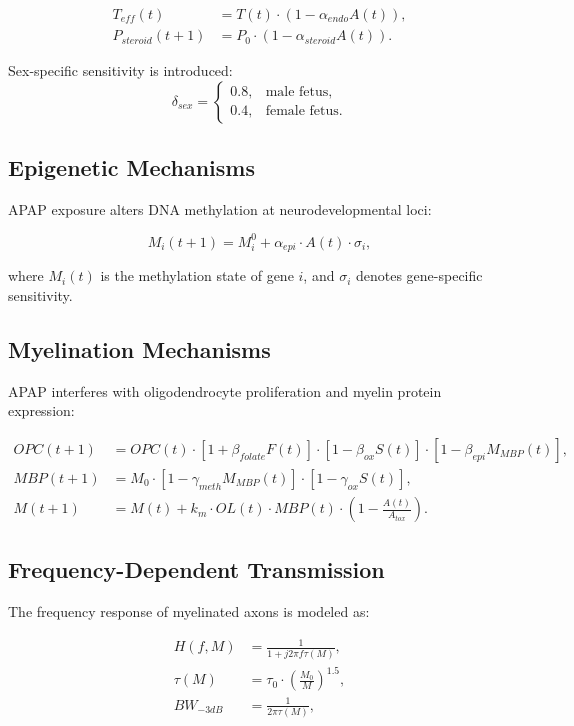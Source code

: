 \documentclass[12pt]{article}
\begin{document}
\begin{align}
T_{eff}(t) &= T(t) \cdot \left(1 - \alpha_{endo}A(t)\right), \\
P_{steroid}(t+1) &= P_0 \cdot \left(1 - \alpha_{steroid}A(t)\right).
\end{align}

Sex-specific sensitivity is introduced:
\[
\delta_{sex} = \begin{cases}
0.8, & \text{male fetus}, \\
0.4, & \text{female fetus}.
\end{cases}
\]

\subsection{Epigenetic Mechanisms}
APAP exposure alters DNA methylation at neurodevelopmental loci:

\begin{equation}
M_i(t+1) = M_i^0 + \alpha_{epi} \cdot A(t) \cdot \sigma_i,
\end{equation}

where $M_i(t)$ is the methylation state of gene $i$, and $\sigma_i$ denotes gene-specific sensitivity.

\subsection{Myelination Mechanisms}
APAP interferes with oligodendrocyte proliferation and myelin protein expression:

\begin{align}
OPC(t+1) &= OPC(t) \cdot [1 + \beta_{folate}F(t)] \cdot [1 - \beta_{ox}S(t)] \cdot [1 - \beta_{epi}M_{MBP}(t)], \\
MBP(t+1) &= M_0 \cdot [1 - \gamma_{meth}M_{MBP}(t)] \cdot [1 - \gamma_{ox}S(t)], \\
M(t+1) &= M(t) + k_m \cdot OL(t) \cdot MBP(t) \cdot \left(1 - \frac{A(t)}{A_{tox}}\right).
\end{align}

\subsection{Frequency-Dependent Transmission}
The frequency response of myelinated axons is modeled as:

\begin{align}
H(f,M) &= \frac{1}{1 + j2\pi f \tau(M)}, \\
\tau(M) &= \tau_0 \cdot \left(\frac{M_0}{M}\right)^{1.5}, \\
BW_{-3dB} &= \frac{1}{2\pi\tau(M)},
\end{align}
\end{document}

